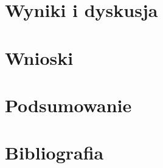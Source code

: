 \documentclass{article}
\begin{document}
        \vspace{0.5cm}

        {
            \Large
            \justifying
            \quad
        }
    \newpage
    \section{Wyniki i dyskusja}
    \newpage
    \section{Wnioski}
    \newpage
    \section{Podsumowanie}
    \newpage
    \section{Bibliografia}
\end{document}
